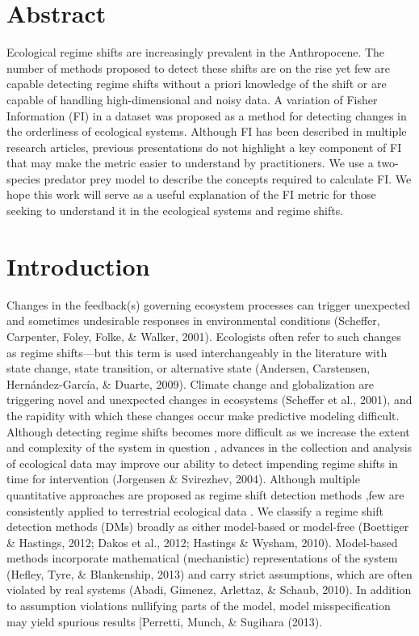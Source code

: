 \documentclass[12pt,twoside]{reedthesis}
\begin{document}
\section{Abstract}\label{abstract-1}

Ecological regime shifts are increasingly prevalent in the Anthropocene.
The number of methods proposed to detect these shifts are on the rise
yet few are capable detecting regime shifts without a priori knowledge
of the shift or are capable of handling high-dimensional and noisy data.
A variation of Fisher Information (FI) in a dataset was proposed as a
method for detecting changes in the orderliness of ecological systems.
Although FI has been described in multiple research articles, previous
presentations do not highlight a key component of FI that may make the
metric easier to understand by practitioners. We use a two-species
predator prey model to describe the concepts required to calculate FI.
We hope this work will serve as a useful explanation of the FI metric
for those seeking to understand it in the ecological systems and regime
shifts.

\section{Introduction}\label{introduction-1}

Changes in the feedback(s) governing ecosystem processes can trigger
unexpected and sometimes undesirable responses in environmental
conditions (Scheffer, Carpenter, Foley, Folke, \& Walker, 2001).
Ecologists often refer to such changes as regime shifts---but this term
is used interchangeably in the literature with state change, state
transition, or alternative state (Andersen, Carstensen,
Hernández-García, \& Duarte, 2009). Climate change and globalization are
triggering novel and unexpected changes in ecosystems (Scheffer et al.,
2001), and the rapidity with which these changes occur make predictive
modeling difficult. Although detecting regime shifts becomes more
difficult as we increase the extent and complexity of the system in
question , advances in the collection and analysis of ecological data
may improve our ability to detect impending regime shifts in time for
intervention (Jorgensen \& Svirezhev, 2004). Although multiple
quantitative approaches are proposed as regime shift detection methods
,few are consistently applied to terrestrial ecological data . We
classify a regime shift detection methods (DMs) broadly as either
model-based or model-free (Boettiger \& Hastings, 2012; Dakos et al.,
2012; Hastings \& Wysham, 2010). Model-based methods incorporate
mathematical (mechanistic) representations of the system (Hefley, Tyre,
\& Blankenship, 2013) and carry strict assumptions, which are often
violated by real systems (Abadi, Gimenez, Arlettaz, \& Schaub, 2010). In
addition to assumption violations nullifying parts of the model, model
misspecification may yield spurious results {[}Perretti, Munch, \&
Sugihara (2013).
\end{document}
